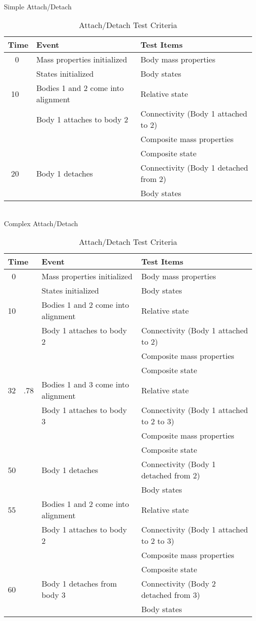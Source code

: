 \begin{table}[htp]
\centering
\caption{Attach/Detach Test Criteria}
\label{tab:attach_detach_criteria}
\ \\[2ex]Simple Attach/Detach \\[6pt]
\begin{tabular}{||r@{}l|p{2.4in}|p{2.7in}|} \hline
\multicolumn{2}{||l|}{\bf Time}
  & {\bf Event} & {\bf Test Items} \\ \hline \hline
0 && Mass properties initialized & Body mass properties \\
 && States initialized & Body states \\[6pt]
10 && Bodies 1 and 2 come into alignment & Relative state \\
 && Body 1 attaches to body 2 & Connectivity (Body 1 attached to 2) \\
 &&& Composite mass properties \\
 &&& Composite state \\[6pt]
20 && Body 1 detaches & Connectivity (Body 1 detached from 2) \\
 &&& Body states \\
\hline
\end{tabular}
 \ \\[4ex]Complex Attach/Detach \\[6pt]
\begin{tabular}{||r@{}l|p{2.4in}|p{2.7in}|} \hline
\multicolumn{2}{||l|}{\bf Time}
  & {\bf Event} & {\bf Test Items} \\ \hline \hline
0 && Mass properties initialized & Body mass properties \\
 && States initialized & Body states \\[6pt]
10 && Bodies 1 and 2 come into alignment & Relative state \\
 && Body 1 attaches to body 2 & Connectivity (Body 1 attached to 2) \\
 &&& Composite mass properties \\
 &&& Composite state \\[6pt]
32&.78 & Bodies 1 and 3 come into alignment & Relative state \\
 && Body 1 attaches to body 3 & Connectivity (Body 1 attached to 2 to 3) \\
 &&& Composite mass properties \\
 &&& Composite state \\[6pt]
50 && Body 1 detaches & Connectivity (Body 1 detached from 2) \\
 &&& Body states \\[6pt]
55 && Bodies 1 and 2 come into alignment & Relative state \\
 && Body 1 attaches to body 2 & Connectivity (Body 1 attached to 2 to 3) \\
 &&& Composite mass properties \\
 &&& Composite state \\[6pt]
60 && Body 1 detaches from body 3 & Connectivity (Body 2 detached from 3) \\
 &&& Body states \\
\hline
\end{tabular}
\end{table}

